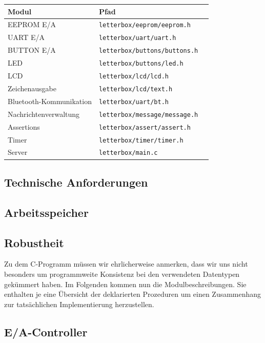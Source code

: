 \documentclass[ngerman]{article}
\begin{document}
\begin{tabular}{|l|l|l|}
    \hline
    {\bf Modul} & {\bf Pfad} & \\
    \hline
    \hline
    EEPROM E/A & {\tt letterbox/eeprom/eeprom.h} & \\
    \hline
    UART E/A & {\tt letterbox/uart/uart.h} & \\
    \hline
    BUTTON E/A & {\tt letterbox/buttons/buttons.h} & \\
    \hline
    LED & {\tt letterbox/buttons/led.h} & \\
    \hline
    LCD & {\tt letterbox/lcd/lcd.h} & \\
    \hline
    Zeichenausgabe & {\tt letterbox/lcd/text.h} & \\
    \hline
    Bluetooth-Kommunikation & {\tt letterbox/uart/bt.h} & \\
    \hline
    Nachrichtenverwaltung & {\tt letterbox/message/message.h} & \\
    \hline
    Assertions & {\tt letterbox/assert/assert.h} &  \\
    \hline
    Timer & {\tt letterbox/timer/timer.h} & \\
    \hline
    Server  & {\tt letterbox/main.c} & \\
    \hline
\end{tabular}


\subsection{Technische Anforderungen}

\subsection{Arbeitsspeicher}

\subsection{Robustheit}

Zu dem C-Programm müssen wir ehrlicherweise anmerken, dass wir uns nicht besonders
um programmweite Konsistenz bei den verwendeten Datentypen gekümmert haben. Im Folgenden
kommen nun die Modulbeschreibungen. Sie enthalten je eine Übersicht der deklarierten
Prozeduren um einen Zusammenhang zur tatsächlichen Implementierung herzustellen.


\subsection{E/A-Controller}
\end{document}
